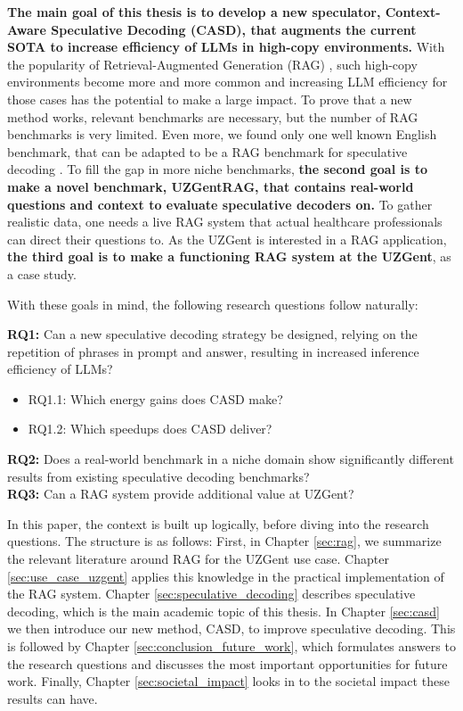 \textbf{The main goal of this thesis is to develop a new speculator, Context-Aware Speculative Decoding (CASD), that augments the current SOTA to increase efficiency of LLMs in high-copy environments.} With the popularity of Retrieval-Augmented Generation (RAG) \cite{k2view2025GenAI, menlov2025state}, such high-copy environments become more and more common and increasing LLM efficiency for those cases has the potential to make a large impact. To prove that a new method works, relevant benchmarks are necessary, but the number of RAG benchmarks is very limited. Even more, we found only one well known English benchmark, that can be adapted to be a RAG benchmark for speculative decoding \cite{rajpurkar2016squad}. To fill the gap in more niche benchmarks, \textbf{the second goal is to make a novel benchmark, UZGentRAG, that contains real-world questions and context to evaluate speculative decoders on.} To gather realistic data, one needs a live RAG system that actual healthcare professionals can direct their questions to. As the UZGent is interested in a RAG application, \textbf{the third goal is to make a functioning RAG system at the UZGent}, as a case study. 

With these goals in mind, the following research questions follow naturally:

\begin{tcolorbox}[colback=blue-ish-light,colframe=blue-ish,title=\textbf{Research Questions}, coltitle=white]
    \textbf{RQ1:} Can a new speculative decoding strategy be designed, relying on the repetition of phrases in prompt and answer, resulting in increased inference efficiency of LLMs?
    \begin{itemize}
    \item RQ1.1: Which energy gains does CASD make?
    \item RQ1.2: Which speedups does CASD deliver?
    \end{itemize}
    \textbf{RQ2:} Does a real-world benchmark in a niche domain show significantly different results from existing speculative decoding benchmarks? \\
    \textbf{RQ3:} Can a RAG system provide additional value at UZGent? \\
\end{tcolorbox}

In this paper, the context is built up logically, before diving into the research questions. The structure is as follows: First, in Chapter \ref{sec:rag}, we summarize the relevant literature around RAG for the UZGent use case. Chapter \ref{sec:use_case_uzgent} applies this knowledge in the practical implementation of the RAG system. Chapter \ref{sec:speculative_decoding} describes speculative decoding, which is the main academic topic of this thesis. In Chapter \ref{sec:casd} we then introduce our new method, CASD, to improve speculative decoding. This is followed by Chapter \ref{sec:conclusion_future_work}, which formulates answers to the research questions and discusses the most important opportunities for future work. Finally, Chapter \ref{sec:societal_impact} looks in to the societal impact these results can have.